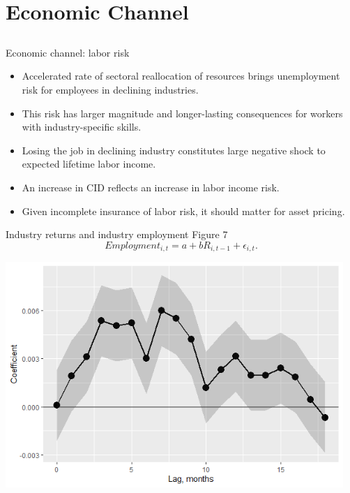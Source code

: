 \documentclass{beamer}
\begin{document}
\section{Economic Channel}
\subsection{}


\normalsize
\begin{frame}{Economic channel: labor risk}
\begin{itemize}
    \item {Accelerated rate of sectoral reallocation of resources brings unemployment risk for employees in declining industries.}
    \item {This risk has larger magnitude and longer-lasting consequences for workers with industry-specific skills.}
    \item {Losing the job in declining industry constitutes large negative shock to expected lifetime labor income.}
    \item {An increase in CID reflects an increase in labor income risk.}
    \item {Given incomplete insurance of labor risk, it should matter for asset pricing.}
\end{itemize}
\end{frame}



\begin{frame}{Industry returns and industry employment}
{Figure 7}
\vspace{-0.4cm}
    $$Employment_{i,t} = a + b R_{i,t-1} + \epsilon_{i,t}.$$
\begin{center}
\includegraphics[width=0.96\textwidth]{paper_nov20/mPred_w.png}
\end{center}
\end{frame}
\end{document}
